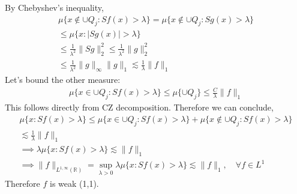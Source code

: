 \documentclass{article}
\newcommand{\R}{\mathbb{R}}
\begin{document}
By Chebyshev's inequality,
\begin{gather*}
    \mu\{x \notin \cup Q_j: Sf(x) > \lambda\} = \mu\{x \notin \cup Q_j: Sg(x) > \lambda\}\\
    \leq \mu\{x: |Sg(x)| > \lambda\}\\
    \leq \frac{1}{\lambda^2} \lVert Sg \rVert_{2}^2 \leq \frac{1}{\lambda^2} \lVert g \rVert_{2}^2\\
    \leq \frac{1}{\lambda^2} \lVert g \rVert_{\infty}\lVert g \rVert_{1} \lesssim \frac{1}{\lambda} \lVert f \rVert_1
\end{gather*}
Let's bound the other measure:
\begin{gather*}
    \mu\{x \in \cup Q_j: Sf(x) > \lambda\} \leq \mu\{\cup Q_j\} \leq \frac{C}{\lambda} \lVert f \rVert_1
\end{gather*}
This follows directly from CZ decomposition. Therefore we can conclude,
\begin{gather*}
    \mu\{x: Sf(x) > \lambda\} \leq \mu\{x \in \cup Q_j: Sf(x) > \lambda\} + \mu\{x \notin \cup Q_j: Sf(x) > \lambda\}\\
    \lesssim \frac{1}{\lambda} \lVert f \rVert_1\\
    \implies \lambda \mu\{x: Sf(x) > \lambda\} \lesssim \lVert f \rVert_1\\
    \implies \lVert f \rVert_{L^{1, \infty}(\R)} = \sup_{\lambda >0}  \lambda \mu\{x: Sf(x) > \lambda\}  \lesssim \lVert f \rVert_1, \quad \forall f \in L^1
\end{gather*}
Therefore $f$ is weak (1,1).
\end{document}
